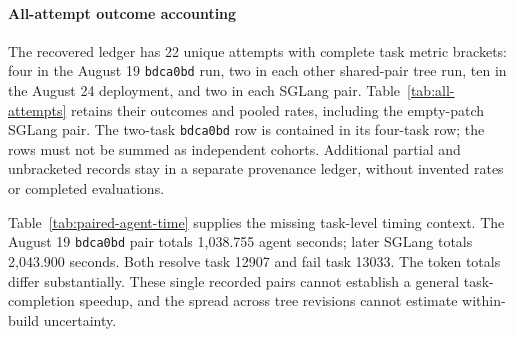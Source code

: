 \paragraph{All-attempt outcome accounting}
The recovered ledger has 22 unique attempts with complete task metric brackets: four in the August 19 \texttt{bdca0bd} run, two in each other shared-pair tree run, ten in the August 24 deployment, and two in each SGLang pair. Table~\ref{tab:all-attempts} retains their outcomes and pooled rates, including the empty-patch SGLang pair. The two-task \texttt{bdca0bd} row is contained in its four-task row; the rows must not be summed as independent cohorts. Additional partial and unbracketed records stay in a separate provenance ledger, without invented rates or completed evaluations.

\begin{table}[t]
\caption{All recovered complete-bracket development cohorts. Rates are descriptive diagnostics under Eq.~\ref{eq:pooled-decode}, including failed attempts. The earlier SGLang pair ($^*$) contains an empty patch and is excluded only from the patch-producing comparison in Table~\ref{tab:pooled-decode}. The first tree pair overlaps the final four-task row; different task populations are not ranked against one another.}
\label{tab:all-attempts}
\centering\small

\end{table}

\begin{table}[t]
\caption{Shared-task agent times and outcomes, including the excluded earlier SGLang pair ($^*$). Task suffixes identify Astropy instances 12907 and 13033. Agent time includes model service and tools, but excludes subsequent evaluation. Different token trajectories are outcomes of the systems and do not isolate kernel cost.}
\label{tab:paired-agent-time}
\centering\footnotesize

\end{table}

Table~\ref{tab:paired-agent-time} supplies the missing task-level timing context. The August 19 \texttt{bdca0bd} pair totals 1,038.755 agent seconds; later SGLang totals 2,043.900 seconds. Both resolve task 12907 and fail task 13033. The token totals differ substantially. These single recorded pairs cannot establish a general task-completion speedup, and the spread across tree revisions cannot estimate within-build uncertainty.
